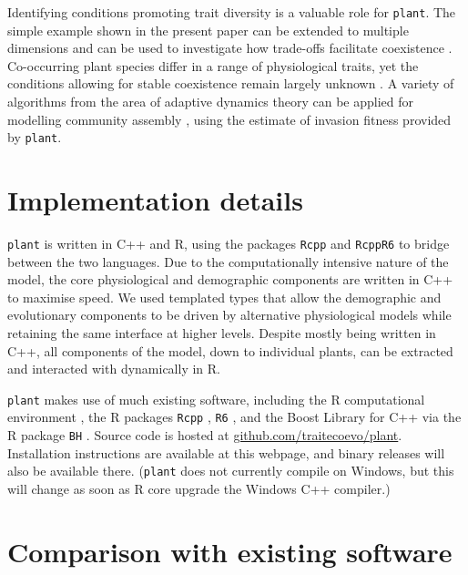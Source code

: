 \documentclass[a4paper,11pt]{article}
\newcommand{\plant}{\texttt{plant}}
\begin{document}
Identifying conditions promoting trait diversity is a valuable role
for {\plant}. The simple example shown in the present paper can be extended to multiple dimensions
and can be used to investigate how trade-offs facilitate coexistence
\citep{Falster-2015}. Co-occurring plant species differ in a range of physiological
traits, yet the conditions allowing for stable coexistence remain largely
unknown \citep{Adler-2013}.
A variety of algorithms from the area of adaptive dynamics theory can be
applied for modelling community assembly \citep[e.g.,][Fig. \ref{fig:schematic}]{
Geritz-1998, Dieckmann-2004, Brannstrom-2013b, Falster-2015}, using the estimate of invasion fitness provided by {\plant}.

\section{Implementation details}

{\plant} is written in C++ and R, using the packages \texttt{Rcpp}
\citep{Eddelbuettel-2011, Eddelbuettel-2013} and \texttt{RcppR6}
\citep{RcppR6} to bridge between the two languages. Due to the
computationally intensive nature of the model, the core physiological
and demographic components are written in C++ to maximise speed. We used
templated types that allow the demographic and evolutionary components
to be driven by alternative physiological models while retaining the
same interface at higher levels. Despite mostly being written in C++,
all components of the model, down to individual plants, can be
extracted and interacted with dynamically in R.

{\plant} makes use of much existing software, including the R
computational environment \citep{R-2015}, the R packages \texttt{Rcpp}
\citep{Eddelbuettel-2011, Eddelbuettel-2013}, \texttt{R6}
\citep{Chang-2014}, and the Boost Library for C++
\citep{Schaling-2014} via the R package \texttt{BH}
\citep{Eddelbuettel-2015}. Source code is hosted at
\href{https://github.com/traitecoevo/plant}{github.com/traitecoevo/plant}.
Installation instructions are available at this webpage, and binary
releases will also be available there. ({\plant} does not
currently compile on Windows, but this will change as soon as R core
upgrade the Windows C++ compiler.)

\section{Comparison with existing software}
\end{document}
